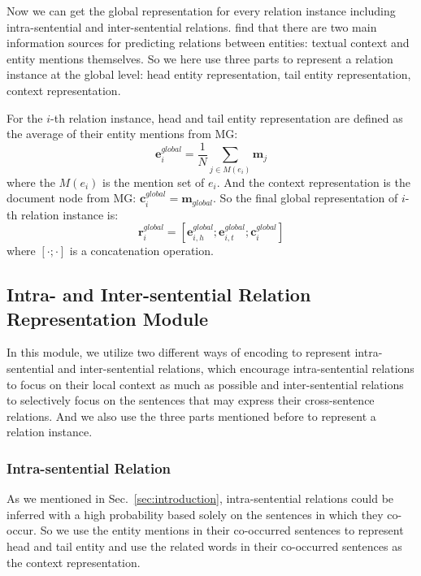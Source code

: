 \documentclass[11pt,a4paper]{article}
\begin{document}
Now we can get the global representation for every relation instance including intra-sentential and inter-sentential relations. \citet{THU_RE} find that there are two main information sources for predicting relations between entities: textual context and entity mentions themselves. So we here use three parts to represent a relation instance at the global level: head entity representation, tail entity representation, context representation.

For the $i$-th relation instance, head and tail entity representation are defined as the average of their entity mentions from MG:
\begin{equation}
    \textbf{e}^{global}_{i} = \frac{1}{N} \sum_{j \in M(e_i)} \textbf{m}_j
    \label{equation:global-entity}
\end{equation}
where the $M(e_i)$ is the mention set of $e_i$. And the context representation is the document node from MG: $\textbf{c}^{global}_{i} = \textbf{m}_{global}$. So the final global representation of $i$-th relation instance is:
\begin{equation}
    \textbf{r}^{global}_{i} = [\textbf{e}^{global}_{i,h};\textbf{e}^{global}_{i,t};\textbf{c}^{global}_{i}]
\end{equation}
where $[\cdot;\cdot]$ is a concatenation operation.

\subsection{Intra- and Inter-sentential Relation Representation Module\label{ssec:intra-inter}}
In this module, we utilize two different ways of encoding to represent intra-sentential and inter-sentential relations, which encourage intra-sentential relations to focus on their local context as much as possible and inter-sentential relations to selectively focus on the sentences that may express their cross-sentence relations. And we also use the three parts mentioned before to represent a relation instance.

\subsubsection{Intra-sentential Relation}
As we mentioned in Sec.~\ref{sec:introduction}, intra-sentential relations could be inferred with a high probability based solely on the sentences in which they co-occur. So we use the entity mentions in their co-occurred sentences to represent head and tail entity and use the related words in their co-occurred sentences as the context representation.
\end{document}
